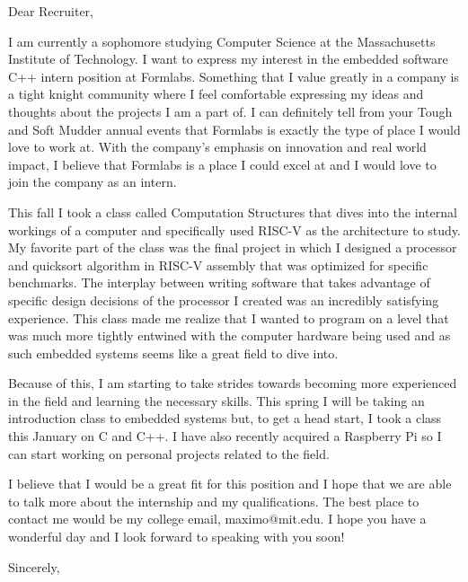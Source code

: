 \documentclass[12pt]{letter}
\begin{document}
\begin{letter}{}
    \opening{Dear Recruiter,}
    I am currently a sophomore studying Computer Science at the Massachusetts Institute of Technology.
    I want to express my interest in the embedded software C++ intern position at Formlabs.
    Something that I value greatly in a company is a tight knight community where I feel comfortable expressing my ideas and thoughts about the projects I am a part of.
    I can definitely tell from your Tough and Soft Mudder annual events that Formlabs is exactly the type of place I would love to work at.
    With the company's emphasis on innovation and real world impact, I believe that Formlabs is a place I could excel at and I would love to join the company as an intern.

    This fall I took a class called Computation Structures that dives into the internal workings of a computer and specifically used RISC-V as the architecture to study.
    My favorite part of the class was the final project in which I designed a processor and quicksort algorithm in RISC-V assembly that was optimized for specific benchmarks.
    The interplay between writing software that takes advantage of specific design decisions of the processor I created was an incredibly satisfying experience.
    This class made me realize that I wanted to program on a level that was much more tightly entwined with the computer hardware being used and as such embedded systems seems like a great field to dive into.

    Because of this, I am starting to take strides towards becoming more experienced in the field and learning the necessary skills.
    This spring I will be taking an introduction class to embedded systems but, to get a head start, I took a class this January on C and C++.
    I have also recently acquired a Raspberry Pi so I can start working on personal projects related to the field.

    I believe that I would be a great fit for this position and I hope that we are able to talk more about the internship and my qualifications.
    The best place to contact me would be my college email, maximo@mit.edu. I hope you have a wonderful day and I look forward to speaking with you soon!
    \closing{Sincerely,}
\end{letter}
\end{document}
